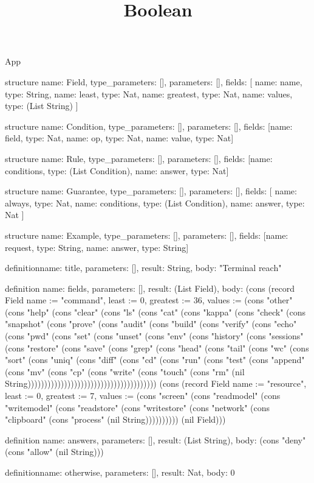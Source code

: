 \begin{lexlean}{App}
\title{Boolean}
\begin{semanticmodule}
structure{
  name: Field,
  type_parameters: [],
  parameters: [],
  fields: [
    {name: name, type: String},
    {name: least, type: Nat},
    {name: greatest, type: Nat},
    {name: values, type: (List String)}
  ]
}

structure{
  name: Condition,
  type_parameters: [],
  parameters: [],
  fields: [{name: field, type: Nat}, {name: op, type: Nat}, {name: value, type: Nat}]
}

structure{
  name: Rule,
  type_parameters: [],
  parameters: [],
  fields: [{name: conditions, type: (List Condition)}, {name: answer, type: Nat}]
}

structure{
  name: Guarantee,
  type_parameters: [],
  parameters: [],
  fields: [
    {name: always, type: Nat},
    {name: conditions, type: (List Condition)},
    {name: answer, type: Nat}
  ]
}

structure{
  name: Example,
  type_parameters: [],
  parameters: [],
  fields: [{name: request, type: String}, {name: answer, type: String}]
}

definition{name: title, parameters: [], result: String, body: "Terminal reach"}

definition{
  name: fields,
  parameters: [],
  result: (List Field),
  body: (cons (record Field {name := "command", least := 0, greatest := 36, values := (cons "other" (cons "help" (cons "clear" (cons "ls" (cons "cat" (cons "kappa" (cons "check" (cons "snapshot" (cons "prove" (cons "audit" (cons "build" (cons "verify" (cons "echo" (cons "pwd" (cons "set" (cons "unset" (cons "env" (cons "history" (cons "sessions" (cons "restore" (cons "save" (cons "grep" (cons "head" (cons "tail" (cons "wc" (cons "sort" (cons "uniq" (cons "diff" (cons "cd" (cons "run" (cons "test" (cons "append" (cons "mv" (cons "cp" (cons "write" (cons "touch" (cons "rm" (nil String))))))))))))))))))))))))))))))))))))))}) (cons (record Field {name := "resource", least := 0, greatest := 7, values := (cons "screen" (cons "readmodel" (cons "writemodel" (cons "readstore" (cons "writestore" (cons "network" (cons "clipboard" (cons "process" (nil String)))))))))}) (nil Field)))
}

definition{
  name: answers,
  parameters: [],
  result: (List String),
  body: (cons "deny" (cons "allow" (nil String)))
}

definition{name: otherwise, parameters: [], result: Nat, body: 0}


\end{semanticmodule}
\end{lexlean}

